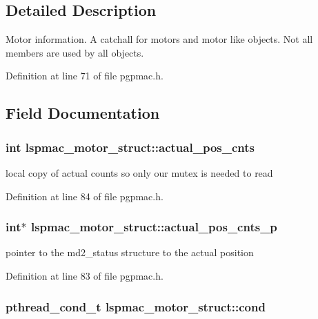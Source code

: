 \subsection{Detailed Description}
Motor information. A catchall for motors and motor like objects. Not all members are used by all objects. 

Definition at line 71 of file pgpmac.h.

\subsection{Field Documentation}
\hypertarget{structlspmac__motor__struct_ae5c7aea45b9637a1817be246688fd980}{
\subsubsection[{actual\_\-pos\_\-cnts}]{\setlength{\rightskip}{0pt plus 5cm}int {\bf lspmac\_\-motor\_\-struct::actual\_\-pos\_\-cnts}}}
\label{structlspmac__motor__struct_ae5c7aea45b9637a1817be246688fd980}


local copy of actual counts so only our mutex is needed to read 

Definition at line 84 of file pgpmac.h.\hypertarget{structlspmac__motor__struct_a312047bb71def5cd2443fecd875eaea5}{
\subsubsection[{actual\_\-pos\_\-cnts\_\-p}]{\setlength{\rightskip}{0pt plus 5cm}int$\ast$ {\bf lspmac\_\-motor\_\-struct::actual\_\-pos\_\-cnts\_\-p}}}
\label{structlspmac__motor__struct_a312047bb71def5cd2443fecd875eaea5}


pointer to the md2\_\-status structure to the actual position 

Definition at line 83 of file pgpmac.h.\hypertarget{structlspmac__motor__struct_aa0ea4108b8fed5b41ff91ca7266f3d84}{
\subsubsection[{cond}]{\setlength{\rightskip}{0pt plus 5cm}pthread\_\-cond\_\-t {\bf lspmac\_\-motor\_\-struct::cond}}}
\label{structlspmac__motor__struct_aa0ea4108b8fed5b41ff91ca7266f3d84}



